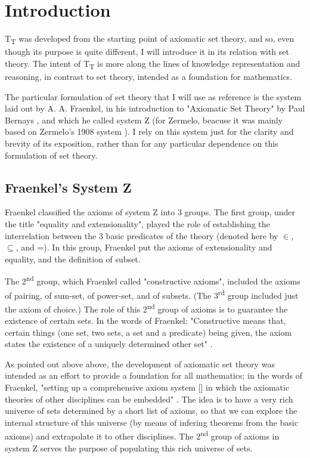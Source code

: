 \documentclass{IOS-Book-Article}     %
\begin{document}

\section{Introduction}
T\textsubscript{T} was developed from the starting point of axiomatic set
theory, and so, even though its purpose is quite different, I will introduce
it in its relation with set theory. The intent of T\textsubscript{T} is more
along the lines of knowledge representation and reasoning, in contrast to set
theory, intended as a foundation for mathematics.

The particular formulation of set theory that I will use as reference is the
system laid out by A. A. Fraenkel, in his introduction to
"Axiomatic Set Theory" by Paul Bernays \cite{r1}, and which he called system Z
(for Zermelo, beacuse it was mainly based on Zermelo's 1908 system \cite{r2}).
I rely on this system just for the clarity and brevity of its exposition, rather
than for any particular dependence on this formulation of set theory.

\subsection{Fraenkel's System Z}
Fraenkel classified the axioms of system Z into 3 groups. The first group,
under the title "equality and extensionality", played the role of
establishing the interrelation between the 3 basic predicates of the theory
(denoted here by $\in$, $\subseteq$, and =). In this group,
Fraenkel put the axioms of extensionality and equality, and the definition of
subset.

The 2\textsuperscript{nd} group, which Fraenkel called "constructive axioms",
included the axioms of pairing, of sum-set, of power-set, and of subsets. (The
3\textsuperscript{rd} group included just the axiom of choice.)
The role of this 2\textsuperscript{nd} group of axioms is to
guarantee the existence of certain sets.  In the words of Fraenkel:
"Constructive means that, certain things (one set, two sets, a set and a
predicate) being given, the axiom states the existence of a uniquely determined
other set" \cite{r1}.

As pointed out above above, the development of axiomatic set theory was
intended as an effort to provide a foundation for all mathematics; in the words
of Fraenkel, "setting up a comprehensive axiom system [\ellipsis] in which the
axiomatic theories of other disciplines can be embedded" \cite{r1}. The idea is
to have a very rich universe of sets determined by a short list of axioms, so
that we can explore the internal structure of this universe (by means of
infering theorems from the basic axioms) and extrapolate it to other
disciplines. The 2\textsuperscript{nd} group of axioms in system Z serves the
purpose of populating this rich universe of sets.
\end{document}
